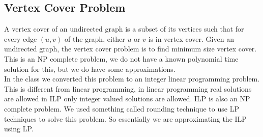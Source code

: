 \documentclass[a4paper,12pt]{report}
\begin{document}
\subsection{Vertex Cover Problem}
A vertex cover of an undirected graph is a subset of its vertices such that for every edge $(u, v)$ of the graph, either $u$ or $v$ is in vertex cover. Given an undirected graph, the vertex cover problem is to find minimum size vertex cover.\\
This is an NP complete problem, we do not have a known polynomial time solution for this, but we do have some approximations.\\ In the class we converted this problem to an integer linear programming problem. This is different from linear programming, in linear programming real solutions are allowed in ILP only integer valued solutions are allowed. ILP is also an NP complete problem. We used something called rounding technique to use LP techniques to solve this problem. So essentially we are approximating the ILP using LP.
\end{document}
